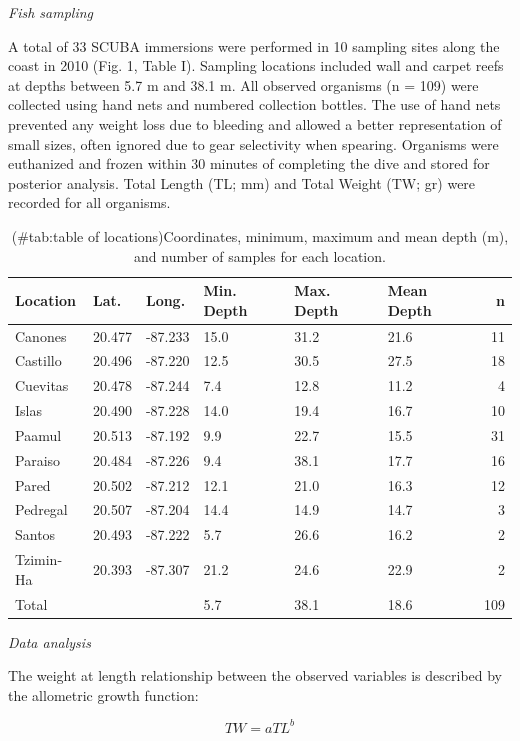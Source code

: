 \documentclass[fleqn,10pt,lineno]{wlpeerj} %
\theoremstyle{definition}
\theoremstyle{definition}
\theoremstyle{definition}
\theoremstyle{remark}
\begin{document}
\emph{Fish sampling}

A total of 33 SCUBA immersions were performed in 10 sampling sites along
the coast in 2010 (Fig. 1, Table I). Sampling locations included wall
and carpet reefs at depths between 5.7 m and 38.1 m. All observed
organisms (n = 109) were collected using hand nets and numbered
collection bottles. The use of hand nets prevented any weight loss due
to bleeding and allowed a better representation of small sizes, often
ignored due to gear selectivity when spearing. Organisms were euthanized
and frozen within 30 minutes of completing the dive and stored for
posterior analysis. Total Length (TL; mm) and Total Weight (TW; gr) were
recorded for all organisms.

\begin{table}

\caption{(\#tab:table of locations)Coordinates, minimum, maximum and mean depth (m), and number of samples for each location.}
\centering
\begin{tabular}[t]{llllllr}
\toprule
Location & Lat. & Long. & Min. Depth & Max. Depth & Mean Depth & n\\
\midrule
Canones & 20.477 & -87.233 & 15.0 & 31.2 & 21.6 & 11\\
Castillo & 20.496 & -87.220 & 12.5 & 30.5 & 27.5 & 18\\
Cuevitas & 20.478 & -87.244 & 7.4 & 12.8 & 11.2 & 4\\
Islas & 20.490 & -87.228 & 14.0 & 19.4 & 16.7 & 10\\
Paamul & 20.513 & -87.192 & 9.9 & 22.7 & 15.5 & 31\\
\addlinespace
Paraiso & 20.484 & -87.226 & 9.4 & 38.1 & 17.7 & 16\\
Pared & 20.502 & -87.212 & 12.1 & 21.0 & 16.3 & 12\\
Pedregal & 20.507 & -87.204 & 14.4 & 14.9 & 14.7 & 3\\
Santos & 20.493 & -87.222 & 5.7 & 26.6 & 16.2 & 2\\
Tzimin-Ha & 20.393 & -87.307 & 21.2 & 24.6 & 22.9 & 2\\
Total &  &  & 5.7 & 38.1 & 18.6 & 109\\
\bottomrule
\end{tabular}
\end{table}

\emph{Data analysis}

The weight at length relationship between the observed variables is
described by the allometric growth function:

\begin{equation}
\label{eq:allometric}
TW = aTL^b
\end{equation}
\end{document}
